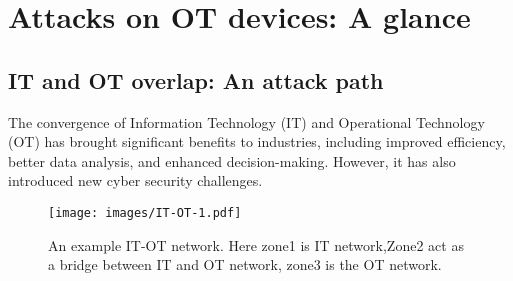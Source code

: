 \section{Attacks on OT devices: A glance}
\label{sec:ga_sbo}
\subsection{IT and OT overlap: An attack path }
The convergence of Information Technology (IT) and Operational Technology (OT) has brought significant benefits to industries, including improved efficiency, better data analysis, and enhanced decision-making. However, it has also introduced new cyber security challenges. 

\begin{figure}[ht!]
    \centering
   \texttt{[image: images/IT-OT-1.pdf]}

    \caption{An example IT-OT network. Here zone1 is IT network,Zone2 act as a bridge between IT and OT network, zone3 is the OT network. }
    \label{fig:itot}
\end{figure}

